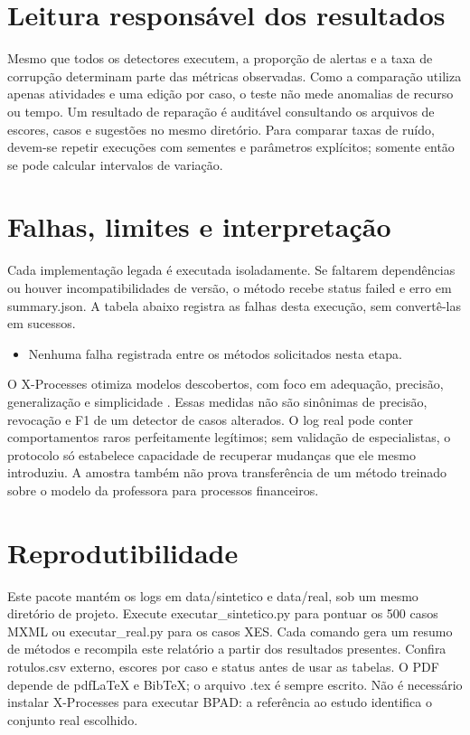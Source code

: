 \documentclass[conference]{IEEEtran}
\begin{document}
\section{Leitura responsável dos resultados}
Mesmo que todos os detectores executem, a proporção de alertas e a taxa de corrupção determinam parte das métricas observadas. Como a comparação utiliza apenas atividades e uma edição por caso, o teste não mede anomalias de recurso ou tempo. Um resultado de reparação é auditável consultando os arquivos de escores, casos e sugestões no mesmo diretório. Para comparar taxas de ruído, devem-se repetir execuções com sementes e parâmetros explícitos; somente então se pode calcular intervalos de variação.

\clearpage
\section{Falhas, limites e interpretação}
Cada implementação legada é executada isoladamente. Se faltarem dependências ou houver incompatibilidades de versão, o método recebe status failed e erro em summary.json. A tabela abaixo registra as falhas desta execução, sem convertê-las em sucessos.
\begin{itemize}
\item Nenhuma falha registrada entre os métodos solicitados nesta etapa.
\end{itemize}

O X-Processes otimiza modelos descobertos, com foco em adequação, precisão, generalização e simplicidade \cite{fantinato2023xprocesses}. Essas medidas não são sinônimas de precisão, revocação e F1 de um detector de casos alterados. O log real pode conter comportamentos raros perfeitamente legítimos; sem validação de especialistas, o protocolo só estabelece capacidade de recuperar mudanças que ele mesmo introduziu. A amostra também não prova transferência de um método treinado sobre o modelo da professora para processos financeiros.

\section{Reprodutibilidade}
Este pacote mantém os logs em data/sintetico e data/real, sob um mesmo diretório de projeto. Execute executar\_sintetico.py para pontuar os 500 casos MXML ou executar\_real.py para os casos XES. Cada comando gera um resumo de métodos e recompila este relatório a partir dos resultados presentes. Confira rotulos.csv externo, escores por caso e status antes de usar as tabelas. O PDF depende de pdfLaTeX e BibTeX; o arquivo .tex é sempre escrito. Não é necessário instalar X-Processes para executar BPAD: a referência ao estudo identifica o conjunto real escolhido.
\end{document}
